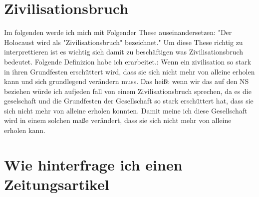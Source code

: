 \documentclass{article}
\begin{document}
\newpage

\section{Zivilisationsbruch}
Im folgenden werde ich mich mit Folgender These auseinandersetzen: "Der Holocaust wird als "Zivilisationsbruch" bezeichnet."
Um diese These richtig zu interprettieren ist es wichtig sich damit zu beschäftigen was Zivilisationsbruch bedeutet. Folgende Definizion habe
ich erarbeitet.: Wenn ein zivilisation so stark in ihren Grundfesten erschüttert wird, dass sie sich nicht mehr von alleine erholen kann
und sich grundlegend verändern muss. Das heißt wenn wir das auf den NS beziehen würde ich aufjeden fall von einem Zivilisationsbruch sprechen,
da es die geselschaft und die Grundfesten der Gesellschaft so stark erschüttert hat, dass sie sich nicht mehr von alleine erholen konnten.
Damit meine ich diese Gesellschaft wird in einem solchen maße verändert, dass sie sich nicht mehr von alleine erholen kann. 

\section{Wie hinterfrage ich einen Zeitungsartikel}
\end{document}
